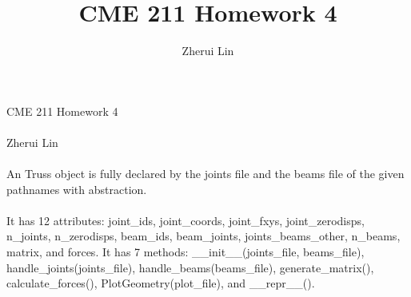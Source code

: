 \documentclass[12pt,letterpaper]{article}
\title{CME 211 Homework 4}
\author{Zherui Lin}
\begin{document}
\paragraph{} CME 211 Homework 4
\paragraph{} Zherui Lin
\paragraph{} An Truss object is fully declared by the joints file and the beams file of the given pathnames with abstraction. 
\paragraph{} It has 12 attributes: joint\_ids, joint\_coords, joint\_fxys, joint\_zerodisps, n\_joints, n\_zerodisps, beam\_ids, beam\_joints, joints\_beams\_other, n\_beams, matrix, and forces. It has 7 methods: \_\_init\_\_(joints\_file, beams\_file), handle\_joints(joints\_file), handle\_beams(beams\_file), generate\_matrix(), calculate\_forces(), PlotGeometry(plot\_file), and \_\_repr\_\_(). 
\end{document}

